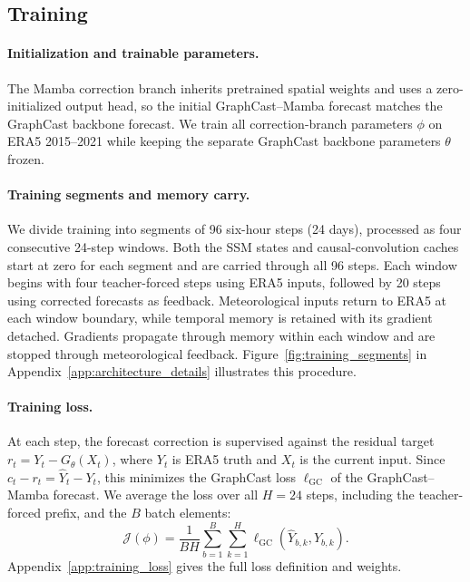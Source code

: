 \documentclass{article}
\newcommand{\vfourchange}[1]{{\color{blue}#1}}
\begin{document}
\subsection{Training}
\label{sec:training}
\paragraph{Initialization and trainable parameters.}
The Mamba correction branch inherits pretrained spatial weights and uses a zero-initialized output head, so the initial GraphCast--Mamba forecast matches the GraphCast backbone forecast. We train all correction-branch parameters $\phi$ on ERA5 2015--2021 while keeping the separate GraphCast backbone parameters $\theta$ frozen.

\paragraph{Training segments and memory carry.}
\vfourchange{We divide training into segments of 96 six-hour steps (24 days), processed as four consecutive 24-step windows. Both the SSM states and causal-convolution caches start at zero for each segment and are carried through all 96 steps. Each window begins with four teacher-forced steps using ERA5 inputs, followed by 20 steps using corrected forecasts as feedback. Meteorological inputs return to ERA5 at each window boundary, while temporal memory is retained with its gradient detached. Gradients propagate through memory within each window and are stopped through meteorological feedback. Figure~\ref{fig:training_segments} in Appendix~\ref{app:architecture_details} illustrates this procedure.}

\paragraph{Training loss.}
At each step, the forecast correction is supervised against the residual target $r_t=Y_t-G_\theta(X_t)$, where $Y_t$ is ERA5 truth and $X_t$ is the current input. Since $c_t-r_t=\hat{Y}_t-Y_t$, this minimizes the {GraphCast loss} $\ell_{\mathrm{GC}}$ of the GraphCast--Mamba forecast. We average the loss over all $H=24$ steps, including the teacher-forced prefix, and the $B$ batch elements:
\begin{equation}
    \mathcal{J}(\phi)
    =\frac{1}{BH}\sum_{b=1}^{B}\sum_{k=1}^{H}
      \ell_{\mathrm{GC}}(\hat{Y}_{b,k},Y_{b,k}).
    \label{eq:training_objective}
\end{equation}
Appendix~\ref{app:training_loss} gives the full loss definition and weights.
\end{document}
